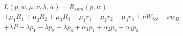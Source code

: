 \documentclass[preview]{standalone}
\begin{document}
\begin{align*}
L(p, w, \mu, \nu, \lambda, \alpha) = R_{sum}(p,w) \\ + \mu_1 R_1 + \mu_2 R_2 + \mu_3 R_3 - \mu_1 r_1 - \mu_2 r_2 - \mu_3 r_3 + \nu W_{tot} - \nu w_B \\ + \lambda P - \lambda p_1 - \lambda p_2 - \lambda p_3 + \alpha_1 p_1 + \alpha_2 p_2 + \alpha_3 p_3
\end{align*}
\end{document}
